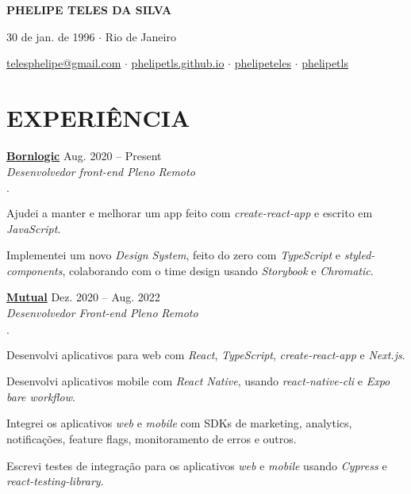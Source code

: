 \documentclass[12pt]{article}
\newenvironment{tightlist}
  {\begin{list}
    {$\cdot$}
    {
      \setlength{\leftmargin}{0em}
      \setlength{\itemsep}{\smallskipamount}
    }
  }
{\end{list}}
\begin{document}
\pagestyle{empty}

\centerline{\huge\bf PHELIPE TELES DA SILVA}
\medskip

\centerline{30 de jan. de 1996 $\cdot$ Rio de Janeiro}
\smallskip

\centerline{
  \href{mailto:telesphelipe@gmail.com}{ telesphelipe@gmail.com}
  $\cdot$
  \href{https://phelipetls.github.io}{ phelipetls.github.io}
  $\cdot$
  \href{https://linkedin.com/in/phelipeteles}{ phelipeteles}
  $\cdot$
  \href{https://github.com/phelipetls/}{ phelipetls}
}
\smallskip

\section*{EXPERIÊNCIA}

\textbf{\href{https://www.bornlogic.com}{Bornlogic}} \hfill Aug. 2020 -- Present \\
\textit{Desenvolvedor front-end Pleno} \hfill \textit{Remoto} {\parfillskip=0pt\par}

\begin{tightlist}
  \item Ajudei a manter e melhorar um app feito com \emph{create-react-app} e
    escrito em \emph{JavaScript}.
  \item Implementei um novo \emph{Design System}, feito do zero com
    \emph{TypeScript} e \emph{styled-components}, colaborando com o time design
    usando \emph{Storybook} e \emph{Chromatic}.
\end{tightlist}

\medskip
\textbf{\href{https://mutual.club}{Mutual}} \hfill Dez. 2020 -- Aug. 2022 \\
\textit{Desenvolvedor Front-end Pleno} \hfill \textit{Remoto} {\parfillskip=0pt\par}

\begin{tightlist}
  \item Desenvolvi aplicativos para web com \emph{React}, \emph{TypeScript},
    \emph{create-react-app} e \emph{Next.js}.
  \item Desenvolvi aplicativos mobile com \emph{React Native}, usando
    \emph{react-native-cli} e \emph{Expo bare workflow}.
  \item Integrei os aplicativos \emph{web} e \emph{mobile} com SDKs de marketing, analytics, notificações, feature flags, monitoramento de erros e outros.
  \item Escrevi testes de integração para os aplicativos \emph{web} e
    \emph{mobile} usando \emph{Cypress} e \emph{react-testing-library}.
\end{tightlist}
\end{document}
